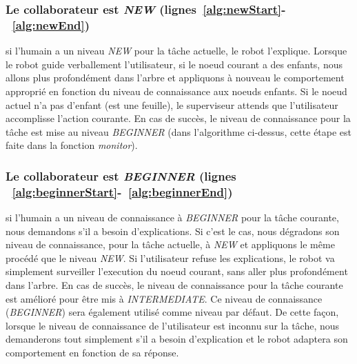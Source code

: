 \documentclass[a4paper,11pt,twoside]{StyleThese}
\begin{document}
\subsubsection{Le collaborateur est \textit{NEW} (lignes~\ref{alg:newStart}-~\ref{alg:newEnd})} si l'humain a un niveau \textit{NEW} pour la tâche actuelle, le robot l'explique.
Lorsque le robot guide verballement l'utilisateur, si le noeud courant a des enfants, nous allons plus profondément dans l'arbre et appliquons à nouveau le comportement approprié en fonction du niveau de connaissance aux noeuds enfants. Si le noeud actuel n'a pas d'enfant (est une feuille), le superviseur attends que l'utilisateur accomplisse l'action courante. En cas de succès, le niveau de connaissance pour la tâche est mise au niveau \textit{BEGINNER} (dans l'algorithme ci-dessus, cette étape est faite dans la fonction \textit{monitor}).



\subsubsection{Le collaborateur est \textit{BEGINNER} (lignes ~\ref{alg:beginnerStart}-~\ref{alg:beginnerEnd})} si l'humain a un niveau de connaissance à \textit{BEGINNER} pour la tâche courante, nous demandons s'il a besoin d'explications. Si c'est le cas, nous dégradons son niveau de connaissance, pour la tâche actuelle, à \textit{NEW} et appliquons le même procédé que le niveau \textit{NEW}. Si l'utilisateur refuse les explications, le robot va simplement surveiller l'execution du noeud courant, sans aller plus profondément dans l'arbre. En cas de succès, le niveau de connaissance pour la tâche courante est amélioré pour être mis à \textit{INTERMEDIATE}. Ce niveau de connaissance (\textit{BEGINNER}) sera également utilisé comme niveau par défaut. De cette façon, lorsque le niveau de connaissance de l'utilisateur est inconnu sur la tâche, nous demanderons tout simplement s'il a besoin d'explication et le robot adaptera son comportement en fonction de sa réponse.
\end{document}
